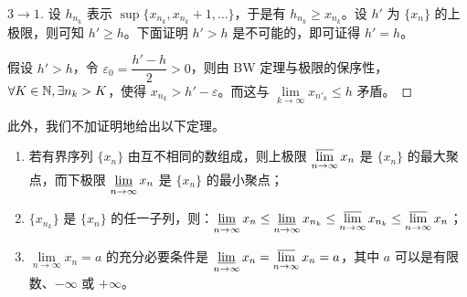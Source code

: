\begin{proof}[$3 \rightarrow 1$]
	设 $h_{n_k}$ 表示 $\sup \{ x_{n_k}, x_{n_k} + 1, \ldots \}$，于是有 $h_{n_k} \ge x_{n_k}$。设 $h'$ 为 $\{ x_n \}$ 的上极限，则可知 $h' \ge h$。下面证明 $h' > h$ 是不可能的，即可证得 $h' = h$。

	假设 $h' > h$，令 $\varepsilon_0 = \dfrac{h' - h}{2} > 0$，则由 BW 定理与极限的保序性，$\forall K \in \mathbb N, \exists n_k > K$，使得 $x_{n_k} > h' - \varepsilon$。而这与 $\lim\limits_{k \to \infty} x_{n'_k} \le h$ 矛盾。
\end{proof}

此外，我们不加证明地给出以下定理。

\begin{theorem}
	\begin{enumerate}
		\item 若有界序列 $\{x_n\}$ 由互不相同的数组成，则上极限 $\mathop{\overline \lim}\limits_{n \rightarrow \infty} x_n$ 是 $\{x_n\}$ 的最大聚点，而下极限 $\mathop{\underline \lim}\limits_{n \rightarrow \infty} x_n$ 是 $\{x_n\}$ 的最小聚点；
		\item $\{x_{n_k}\}$ 是 $\{x_n\}$ 的任一子列，则：$\mathop{\underline \lim}\limits_{n \rightarrow \infty} x_n \le \mathop{\underline \lim}\limits_{n \rightarrow \infty} x_{n_k} \le \mathop{\overline \lim}\limits_{n \rightarrow \infty} x_{n_k} \le \mathop{\overline \lim}\limits_{n \rightarrow \infty} x_n$；
		\item $\lim\limits_{n \rightarrow \infty} x_n = a$ 的充分必要条件是 $\mathop{\underline \lim}\limits_{n \rightarrow \infty} x_n = \mathop{\overline \lim}\limits_{n \rightarrow \infty} x_n = a$，其中 $a$ 可以是有限数、$-\infty$ 或 $+\infty$。
	\end{enumerate}
\end{theorem}


